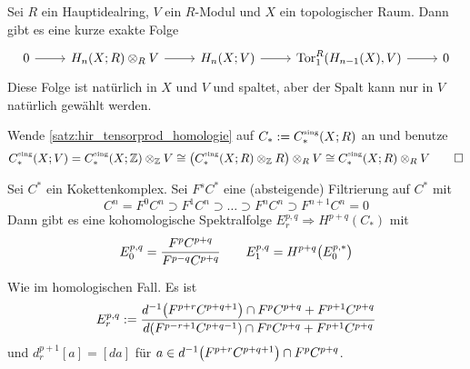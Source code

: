 \begin{satz}
	Sei $R$ ein Hauptidealring, $V$ ein $R$-Modul und $X$ ein topologischer Raum.
	Dann gibt es eine kurze exakte Folge 
	\[
		\begin{tikzcd}
			0 \rar & H_n(X;R) \otimes_R V \rar & H_n(X;V) \rar & \Tor_1^R \enbrace*{H_{n-1}(X),V} \rar & 0
		\end{tikzcd}
	\] 
	Diese Folge ist natürlich in $X$ und $V$ und spaltet, aber der Spalt kann nur in $V$ natürlich gewählt werden.
\end{satz}
\begin{beweis}
	Wende \autoref{satz:hir_tensorprod_homologie} auf $C_* := C_*^\sing(X;R)$ an und benutze 
	\[
		C_*^\sing(X;V) = C^\sing_*(X;\mathbb{Z}) \otimes_\mathbb{Z} V \cong \enbrace*{C_*^\sing(X;R) \otimes_\mathbb{Z} R} \otimes_R V \cong C_*^\sing(X;R) \otimes_R V \qedhere
	\]
\end{beweis}

\begin{satz}[{name={Kohomologische Spektralfolge einer Filtrierung}}]
	Sei $C^*$ ein Kokettenkomplex.
	Sei $F^s C^*$ eine (absteigende) Filtrierung auf $C^*$ mit
	\[
		C^n =F^0 C^n \supset F^1C^n \supset \ldots \supset F^nC^n \supset F^{n+1} C^n=0
	\]
	Dann gibt es eine kohomologische Spektralfolge
	\(
		E^{p,q}_r \Rightarrow H^{p+q}(C_*)
	\)
	mit 
	\[
		E_0^{p,q}= \frac{F^pC^{p+q}}{F^{p-q}C^{p+q}} \qquad E^{p,q}_1 = H^{p+q}\enbrace*{E_0^{p,*}}
	\]
\end{satz}
\begin{beweis}
	Wie im homologischen Fall.
	Es ist 
	\[
		E^{p,q}_r := \frac{d^{-1} \enbrace*{F^{p+r}C^{p+q+1}} \cap F^pC^{p+q} + F^{p+1}C^{p+q}}{d \enbrace*{F^{p-r+1} C^{p+q-1}} \cap F^p C^{p+q} + F^{p+1}C^{p+q}} 
	\]
	und $d^{p+1}_r[a]=[d a]$ für $a \in d^{-1} \enbrace*{F^{p+r}C^{p+q+1}} \cap F^pC^{p+q}$.
\end{beweis}

